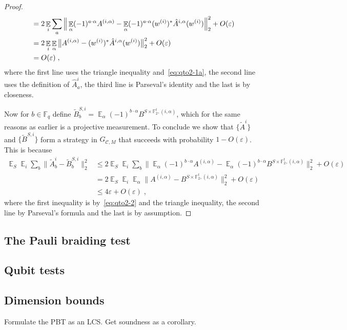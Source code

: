 \documentclass[11pt]{article}
\theoremstyle{definition}
\newcommand{\code}{\mathscr{C}}
\DeclareMathOperator*{\Expectation}{\mathbb{E}}
\newcommand{\Es}[1]{\Expectation_{#1}}
\newcommand{\F}{\ensuremath{\mathbb{F}}}
\newcommand{\eps}{\varepsilon}
\begin{document}
\begin{proof}
\begin{align}
&=  2\Es{i} \sum_a \Big\| \Es{\alpha} (-1)^{a\cdot \alpha} A^{(i,\alpha)} -   \Es{\alpha} (-1)^{a\cdot \alpha} (w^{(i)})^* \hat{A}^{i,\alpha} (w^{(i)}) \Big\|_2^2+ O(\eps) \notag\\
&= 2\Es{i} \Es{\alpha} \big\| A^{(i,\alpha)} -    (w^{(i)})^* \hat{A}^{i,\alpha} (w^{(i)}) \big\|_2^2+ O(\eps)\notag\\
&= O(\eps)\;, \label{eq:qto2-2}
\end{align}
where the first line uses the triangle inequality and~\eqref{eq:qto2-1a}, the second line uses the definition of $\hat{A}^i_a$, the third line is Parseval's identity and the last is by closeness. 

Now for $b\in \F_q$ define $\tilde{B}^{S,i}_b= \Es{\alpha} (-1)^{b\cdot \alpha} B^{S\times \F_2^t,(i,\alpha)}$, which for the same reasons as earlier is a projective measurement. 
To conclude we show that $\{\tilde{A}^{i}\}$ and $\{\tilde{B}^{S,i}\}$ form a strategy in $G_{\code, M}$ that succeeds with probability $1-O(\eps)$. This is because
\begin{align*}
\Es{S}\Es{i} \sum_b \big\| \tilde{A}^i_b - \tilde{B}^{S,i}_b \big\|_2^2
&\leq 2\Es{S}\Es{i} \sum_b \Big\| \Es{\alpha} (-1)^{b\cdot \alpha} {A}^{(i,\alpha)} - \Es{\alpha} (-1)^{b\cdot \alpha} B^{S\times \F_2^t,(i,\alpha)}\Big\|_2^2 + O(\eps)\\
&= 2\Es{S}\Es{i} \Es{\alpha}\big\|  {A}^{(i,\alpha)} -  B^{S\times \F_2^t,(i,\alpha)}\big\|_2^2 + O(\eps)\\
&\leq 4\eps + O(\eps)\;,
\end{align*}
where the first inequality is by~\eqref{eq:qto2-2} and the triangle inequality, the second line by Parseval's formula and the last is by assumption. 
\end{proof}

\subsection{The Pauli braiding test}

\subsection{Qubit tests}

\subsection{Dimension bounds}


Formulate the PBT as an LCS. Get soundness as a corollary. 







\notesendofpaper
\end{document}
